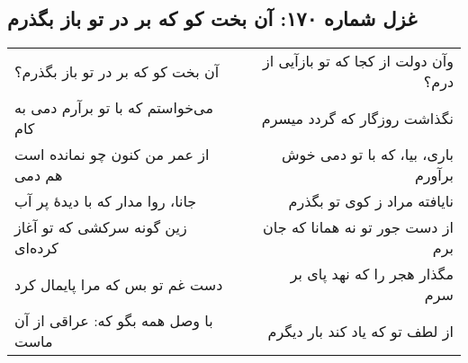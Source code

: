 \begin{center}
\section*{غزل شماره ۱۷۰: آن بخت کو که بر در تو باز بگذرم}
\label{sec:170}
\begin{longtable}{l p{0.5cm} r}
آن بخت کو که بر در تو باز بگذرم؟
&&
وآن دولت از کجا که تو بازآیی از درم؟
\\
می‌خواستم که با تو برآرم دمی به کام
&&
نگذاشت روزگار که گردد میسرم
\\
از عمر من کنون چو نمانده است هم دمی
&&
باری، بیا، که با تو دمی خوش برآورم
\\
جانا، روا مدار که با دیدهٔ پر آب
&&
نایافته مراد ز کوی تو بگذرم
\\
زین گونه سرکشی که تو آغاز کرده‌ای
&&
از دست جور تو نه همانا که جان برم
\\
دست غم تو بس که مرا پایمال کرد
&&
مگذار هجر را که نهد پای بر سرم
\\
با وصل همه بگو که: عراقی از آن ماست
&&
از لطف تو که یاد کند بار دیگرم
\\
\end{longtable}
\end{center}
